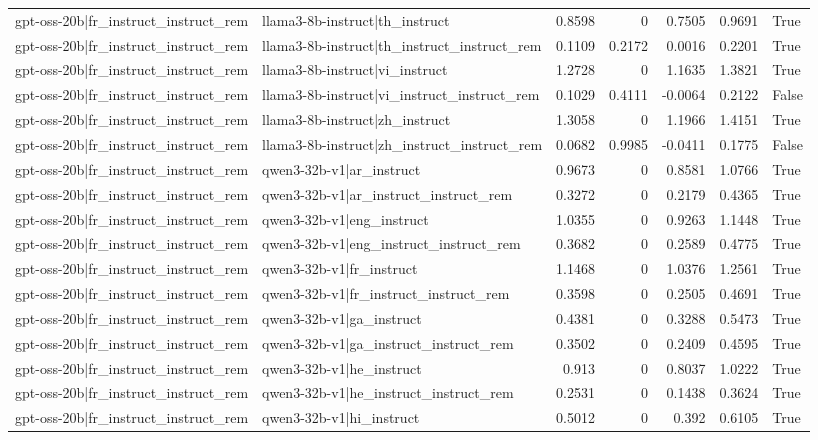 \begin{table}
\begin{tabular}{l l r r r r l}
gpt-oss-20b|fr_instruct_instruct_rem & llama3-8b-instruct|th_instruct & 0.8598 & 0 & 0.7505 & 0.9691 & True \\
gpt-oss-20b|fr_instruct_instruct_rem & llama3-8b-instruct|th_instruct_instruct_rem & 0.1109 & 0.2172 & 0.0016 & 0.2201 & True \\
gpt-oss-20b|fr_instruct_instruct_rem & llama3-8b-instruct|vi_instruct & 1.2728 & 0 & 1.1635 & 1.3821 & True \\
gpt-oss-20b|fr_instruct_instruct_rem & llama3-8b-instruct|vi_instruct_instruct_rem & 0.1029 & 0.4111 & -0.0064 & 0.2122 & False \\
gpt-oss-20b|fr_instruct_instruct_rem & llama3-8b-instruct|zh_instruct & 1.3058 & 0 & 1.1966 & 1.4151 & True \\
gpt-oss-20b|fr_instruct_instruct_rem & llama3-8b-instruct|zh_instruct_instruct_rem & 0.0682 & 0.9985 & -0.0411 & 0.1775 & False \\
gpt-oss-20b|fr_instruct_instruct_rem & qwen3-32b-v1|ar_instruct & 0.9673 & 0 & 0.8581 & 1.0766 & True \\
gpt-oss-20b|fr_instruct_instruct_rem & qwen3-32b-v1|ar_instruct_instruct_rem & 0.3272 & 0 & 0.2179 & 0.4365 & True \\
gpt-oss-20b|fr_instruct_instruct_rem & qwen3-32b-v1|eng_instruct & 1.0355 & 0 & 0.9263 & 1.1448 & True \\
gpt-oss-20b|fr_instruct_instruct_rem & qwen3-32b-v1|eng_instruct_instruct_rem & 0.3682 & 0 & 0.2589 & 0.4775 & True \\
gpt-oss-20b|fr_instruct_instruct_rem & qwen3-32b-v1|fr_instruct & 1.1468 & 0 & 1.0376 & 1.2561 & True \\
gpt-oss-20b|fr_instruct_instruct_rem & qwen3-32b-v1|fr_instruct_instruct_rem & 0.3598 & 0 & 0.2505 & 0.4691 & True \\
gpt-oss-20b|fr_instruct_instruct_rem & qwen3-32b-v1|ga_instruct & 0.4381 & 0 & 0.3288 & 0.5473 & True \\
gpt-oss-20b|fr_instruct_instruct_rem & qwen3-32b-v1|ga_instruct_instruct_rem & 0.3502 & 0 & 0.2409 & 0.4595 & True \\
gpt-oss-20b|fr_instruct_instruct_rem & qwen3-32b-v1|he_instruct & 0.913 & 0 & 0.8037 & 1.0222 & True \\
gpt-oss-20b|fr_instruct_instruct_rem & qwen3-32b-v1|he_instruct_instruct_rem & 0.2531 & 0 & 0.1438 & 0.3624 & True \\
gpt-oss-20b|fr_instruct_instruct_rem & qwen3-32b-v1|hi_instruct & 0.5012 & 0 & 0.392 & 0.6105 & True \\

\end{tabular}
\end{table}
